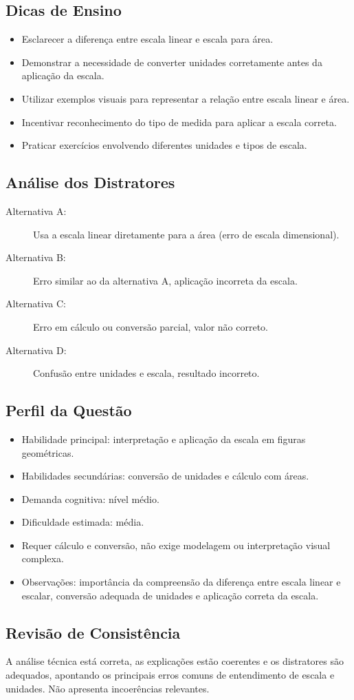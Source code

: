 \documentclass{article}
\begin{document}
\subsection*{Dicas de Ensino}

\begin{itemize}
  \item Esclarecer a diferença entre escala linear e escala para área.
  \item Demonstrar a necessidade de converter unidades corretamente antes da aplicação da escala.
  \item Utilizar exemplos visuais para representar a relação entre escala linear e área.
  \item Incentivar reconhecimento do tipo de medida para aplicar a escala correta.
  \item Praticar exercícios envolvendo diferentes unidades e tipos de escala.
\end{itemize}

\subsection*{Análise dos Distratores}

\begin{description}
  \item[Alternativa A:] Usa a escala linear diretamente para a área (erro de escala dimensional).
  \item[Alternativa B:] Erro similar ao da alternativa A, aplicação incorreta da escala.
  \item[Alternativa C:] Erro em cálculo ou conversão parcial, valor não correto.
  \item[Alternativa D:] Confusão entre unidades e escala, resultado incorreto.
\end{description}

\subsection*{Perfil da Questão}

\begin{itemize}
  \item Habilidade principal: interpretação e aplicação da escala em figuras geométricas.
  \item Habilidades secundárias: conversão de unidades e cálculo com áreas.
  \item Demanda cognitiva: nível médio.
  \item Dificuldade estimada: média.
  \item Requer cálculo e conversão, não exige modelagem ou interpretação visual complexa.
  \item Observações: importância da compreensão da diferença entre escala linear e escalar, conversão adequada de unidades e aplicação correta da escala.
\end{itemize}

\subsection*{Revisão de Consistência}

A análise técnica está correta, as explicações estão coerentes e os distratores são adequados, apontando os principais erros comuns de entendimento de escala e unidades. Não apresenta incoerências relevantes.
\end{document}
